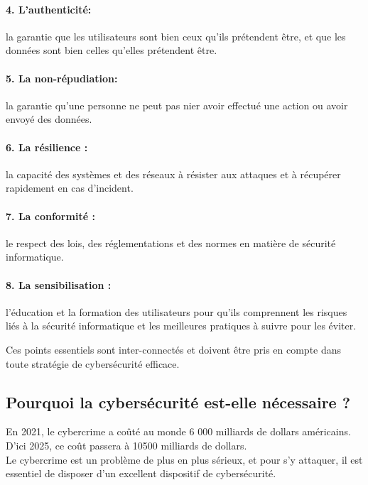  \paragraph{4. L'authenticité:\\} la garantie que les utilisateurs sont bien ceux qu'ils prétendent être, et que les données sont bien celles qu'elles prétendent être.

 \paragraph{5. La non-répudiation:\\} la garantie qu'une personne ne peut pas nier avoir effectué une action ou avoir envoyé des données.

 \paragraph{6. La résilience :\\} la capacité des systèmes et des réseaux à résister aux attaques et à récupérer rapidement en cas d'incident.


 \paragraph{7. La conformité :\\} le respect des lois, des réglementations et des normes en matière de sécurité informatique.

 \paragraph{8. La sensibilisation :\\} l'éducation et la formation des utilisateurs pour qu'ils comprennent les risques liés à la sécurité informatique et les meilleures pratiques à suivre pour les éviter.
 
Ces points essentiels sont inter-connectés et doivent être pris en compte dans toute stratégie de cybersécurité efficace.\\
\subsection{Pourquoi la cybersécurité est-elle nécessaire ?}
En 2021, le cybercrime a coûté au monde 6 000 milliards de dollars américains. D’ici 2025, ce coût passera à 10500 milliards de dollars.\\
 Le cybercrime est un problème de plus en plus sérieux, et pour s’y attaquer, il est essentiel de disposer d’un excellent dispositif de cybersécurité.\\

